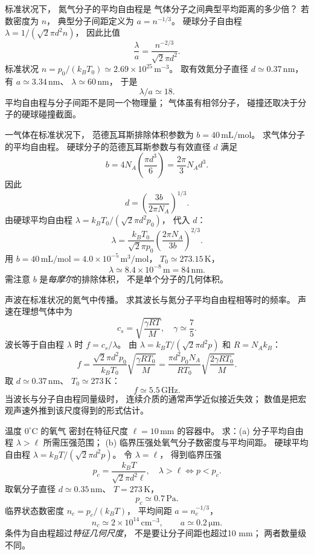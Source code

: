 标准状况下，
氮气分子的平均自由程是
气体分子之间典型平均距离的多少倍？
\exsolution
若数密度为 $n$，
典型分子间距定义为
$a=n^{-1/3}$。
硬球分子自由程
$\lambda=1/(\sqrt2\pi d^2n)$，
因此比值
\[
\boxed{\frac{\lambda}{a}
=\frac{n^{-2/3}}{\sqrt2\pi d^2}}.
\]
标准状况
$n=p_0/(k_BT_0)
\simeq2.69\times10^{25}\,\mathrm{m^{-3}}$。
取有效氮分子直径
$d\simeq0.37\,\mathrm{nm}$，
有 $a\simeq3.34\,\mathrm{nm}$、
$\lambda\simeq60\,\mathrm{nm}$，
于是
\[
\boxed{\lambda/a\simeq18}.
\]
\excheck 平均自由程与分子间距不是同一个物理量；
气体虽有相邻分子，
碰撞还取决于分子的硬球碰撞截面。

一气体在标准状况下，
范德瓦耳斯排除体积参数为
$b=40\,\mathrm{mL/mol}$。
求气体分子的平均自由程。
\exsolution
硬球分子的范德瓦耳斯参数与有效直径 $d$
满足
\[
b=4N_A\left(\frac{\pi d^3}{6}\right)
=\frac{2\pi}3N_A d^3.
\]
因此
\[
d=\left(\frac{3b}{2\pi N_A}\right)^{1/3}.
\]
由硬球平均自由程
$\lambda=k_BT_0/(\sqrt2\pi d^2p_0)$，
代入 $d$：
\[
\boxed{\lambda=
\frac{k_BT_0}{\sqrt2\pi p_0}
\left(\frac{2\pi N_A}{3b}\right)^{2/3}}.
\]
用
$b=40\,\mathrm{mL/mol}=4.0\times10^{-5}\,\mathrm{m^3/mol}$，
$T_0\simeq273.15\,\mathrm K$，
\[
\boxed{\lambda\simeq8.4\times10^{-8}\,\mathrm m
=84\,\mathrm{nm}}.
\]
\excheck 需注意 $b$ 是\emph{每摩尔}的排除体积，
不是单个分子的几何体积。

声波在标准状况的氮气中传播。
求其波长与氮分子平均自由程相等时的频率。
\exsolution
声速在理想气体中为
\[
c_s=\sqrt{\frac{\gamma RT}{M}},
\quad \gamma\simeq\frac75.
\]
波长等于自由程 $\lambda$ 时
$f=c_s/\lambda$。
由 $\lambda=k_BT/(\sqrt2\pi d^2p)$
和 $R=N_Ak_B$：
\[
\boxed{f=
\frac{\sqrt2\pi d^2p_0}{k_BT_0}
\sqrt{\frac{\gamma RT_0}{M}}
=\frac{\pi d^2p_0N_A}{RT_0}
\sqrt{\frac{2\gamma RT_0}{M}}}.
\]
取 $d\simeq0.37\,\mathrm{nm}$、
$T_0\simeq273\,\mathrm K$：
\[
\boxed{f\simeq5.5\,\mathrm{GHz}}.
\]
\excheck 当波长与分子自由程同量级时，
连续介质的通常声学近似接近失效；
数值是把宏观声速外推到该尺度得到的形式估计。

温度 $0^\circ\mathrm C$ 的氧气
密封在特征尺度
$\ell=10\,\mathrm{mm}$ 的容器中。
求：(a) 分子平均自由程
$\lambda>\ell$ 所需压强范围；
(b) 临界压强处氧气分子数密度与平均间距。
\exsolution
硬球平均自由程
$\lambda=k_BT/(\sqrt2\pi d^2p)$。
令 $\lambda=\ell$，
得到临界压强
\[
\boxed{p_c=\frac{k_BT}{\sqrt2\pi d^2\ell}},
\quad
\lambda>\ell\iff p<p_c.
\]
取氧分子直径
$d\simeq0.35\,\mathrm{nm}$、
$T=273\,\mathrm K$，
\[
\boxed{p_c\simeq0.7\,\mathrm{Pa}}.
\]
临界状态数密度
$n_c=p_c/(k_BT)$，
平均间距
$a=n_c^{-1/3}$，
\[
\boxed{n_c\simeq2\times10^{14}\,
\mathrm{cm^{-3}}},\qquad
\boxed{a\simeq0.2\,\mathrm{\mu m}}.
\]
\excheck 条件为自由程超过\emph{特征几何尺度}，
不是要让分子间距也超过10 mm；
两者数量级不同。

